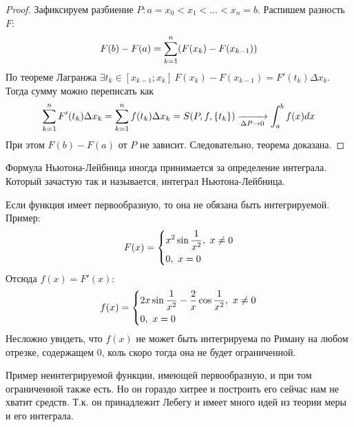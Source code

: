 \begin{proof}
	Зафиксируем разбиение $P \colon a = x_0 < x_1 < \ldots < x_n = b$. Распишем разность $F$:
	\[
		F(b) - F(a) = \sum\limits_{k = 1}^n (F(x_k) - F(x_{k - 1}))
	\]
	По теореме Лагранжа $\exists t_k \in [x_{k - 1};x_k]\ F(x_k) - F(x_{k - 1}) = F'(t_k)\Delta x_k$. Тогда сумму можно переписать как
	\[
		\sum\limits_{k = 1}^nF'(t_k)\Delta x_k = \sum\limits_{k = 1}^nf(t_k)\Delta x_k = S(P, f, \{t_k\}) \xrightarrow[\Delta P \to 0]{} \int_a^b f(x)dx
	\]
	При этом $F(b) - F(a)$ от $P$ не зависит. Следовательно, теорема доказана.
\end{proof}

\begin{note}
	Формула Ньютона-Лейбница иногда принимается за определение интеграла. Который зачастую так и называется, интеграл Ньютона-Лейбница.
\end{note}

\begin{note}
	Если функция имеет первообразную, то она не обязана быть интегрируемой. Пример:
	\[
		F(x) = \left\{\begin{aligned}
			&{x^2 \sin \frac{1}{x^2},\ x \neq 0}
			\\
			&{0,\ x = 0}
		\end{aligned}\right.
	\]
	Отсюда $f(x) = F'(x)$:
	\[
		f(x) = \left\{\begin{aligned}
			&{2x \sin \frac{1}{x^2} - \frac{2}{x}\cos \frac{1}{x^2},\ x \neq 0}
			\\
			&{0,\ x = 0}
		\end{aligned}\right.
	\]
	Несложно увидеть, что $f(x)$ не может быть интегрируема по Риману на любом отрезке, содержащем 0, коль скоро тогда она не будет ограниченной.
\end{note}

\begin{note}
	Пример неинтегрируемой функции, имеющей первообразную, и при том ограниченной также есть. Но он гораздо хитрее и построить его сейчас нам не хватит средств. Т.к. он принадлежит Лебегу и имеет много идей из теории меры и его интеграла.
\end{note}
